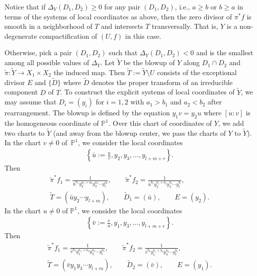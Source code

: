 \documentclass[11pt]{article}
\newcommand{\PP}{\mathbb{P}}
\newcommand{\cpt}{compactification}
\begin{document}
Notice that if $\Delta_Y(D_1,D_2) \geq 0$ for any pair $(D_1, D_2)$, i.e., $a\geq b$ or $b\geq a$ in terms of the systems of local coordinates as above, then the zero divisor of $\pi^*f$ is smooth in a neighborhood of $T$
and intersects $T$ transversally. That is, $Y$ is a non-degenerate {\cpt} of $(U,f)$ in this case.

Otherwise, pick a pair $(D_1,D_2)$ such that $\Delta_Y(D_1,D_2) <0$ and is the smallest among all possible values of $\Delta_Y$. Let $\widetilde{Y}$ be the blowup of $Y$ along $D_1\cap D_2$ and $\tilde{\pi}\colon \widetilde{Y} \to X_1\times X_2$ the induced map. Then $\widetilde{T}:= \widetilde{Y}\setminus U$ consists of the exceptional divisor $E$ and $\{\widetilde{D}\}$ where $\widetilde{D}$ denotes the proper transform of an irreducible component $D$ of $T$. To construct the explicit systems of local coordinates of $\widetilde{Y}$, we may assume that $D_i = (y_i)$ for $i=1,2$ with $a_1 > b_1$ and $a_2 < b_2$ after rearrangement. The blowup is defined by the equation $y_1v=y_2u$ where $[u:v]$ is the homogeneous coordinate of $\PP^1$. Over this chart of coordinates of $Y$, we add two charts to $\widetilde{Y}$ (and away from the blowup center, we pass the charts of $Y$ to $\widetilde{Y}$). In the chart $v\neq 0$ of~$\PP^1$, we consider the local coordinates
\begin{gather}\label{eq:Yv_LocCoor}
\left\{ \bar{u}:= \frac{u}{v}, y_2, y_3, \dots, y_{l+m+r} \right\}.
\end{gather}
Then
\begin{gather}\label{eq:Yv_LocBeh}
\tilde{\pi}^*f_1 = \frac{1}{\bar{u}^{a_1}y_2^{a_1+a_2}	y_3^{a_3}\cdots y_l^{a_l}},\qquad \tilde{\pi}^*f_2 = \frac{1}{\bar{u}^{b_1}y_2^{b_1+b_2}	y_3^{b_3}\cdots y_l^{b_l}},
\\\widetilde{T} = (\bar{u}y_2\cdots y_{l+m}),\qquad \widetilde{D}_1 = (\bar{u}), \qquad E = (y_2).\nonumber \end{gather}
In the chart $u\neq 0$ of $\PP^1$, we consider the local coordinates
\begin{gather}\label{eq:Yu_LocCoor}
\left\{ \bar{v}:= \frac{v}{u}, y_1, y_3, \dots, y_{l+m+r} \right\}.
\end{gather}
Then
\begin{gather}\label{eq:Yu_LocBeh}
\tilde{\pi}^*f_1 = \frac{1}{\bar{v}^{a_2}y_1^{a_1+a_2}	y_3^{a_3}\cdots y_l^{a_l}},\qquad \tilde{\pi}^*f_2 = \frac{1}{\bar{v}^{b_2}y_1^{b_1+b_2}	y_3^{b_3}\cdots y_l^{b_l}},
\\ \widetilde{T} = (\bar{v}y_1y_3\cdots y_{l+m}),\qquad \widetilde{D}_2 = (\bar{v}), \qquad E = (y_1). \nonumber\end{gather}
\end{document}

